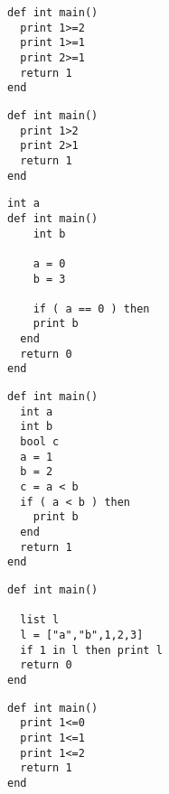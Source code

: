 \documentclass[11pt]{article}
\begin{document}
\begin{listing}[H]
  \begin{verbatim}
def int main()
  print 1>=2
  print 1>=1
  print 2>=1
  return 1
end
  \end{verbatim}
\end{listing}

\begin{listing}[H]
  \begin{verbatim}
def int main()
  print 1>2
  print 2>1
  return 1
end
  \end{verbatim}
\end{listing}

\begin{listing}[H]
  \begin{verbatim}
int a
def int main()
    int b

    a = 0
    b = 3

    if ( a == 0 ) then
    print b
  end
  return 0
end
  \end{verbatim}
\end{listing}

\begin{listing}[H]
  \begin{verbatim}
def int main()
  int a
  int b
  bool c
  a = 1
  b = 2
  c = a < b
  if ( a < b ) then
    print b
  end
  return 1
end

  \end{verbatim}
\end{listing}

\begin{listing}[H]
  \begin{verbatim}
def int main()

  list l
  l = ["a","b",1,2,3]
  if 1 in l then print l
  return 0
end
  \end{verbatim}
\end{listing}

\begin{listing}[H]
  \begin{verbatim}
def int main()
  print 1<=0
  print 1<=1
  print 1<=2
  return 1
end
  \end{verbatim}
\end{listing}
\end{document}
